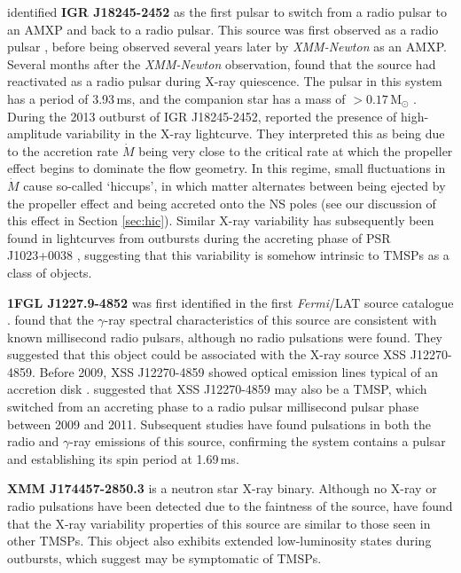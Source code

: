 \par \citealp{Papitto_Swings} identified \textbf{IGR J18245-2452} as the first pulsar to switch from a radio pulsar to an AMXP and back to a radio pulsar.  This source was first observed as a radio pulsar \citep{Manchester_PulsarCat}, before being observed several years later by \textit{XMM-Newton} \citep{Eckert_IGRJ18245} as an AMXP. Several months after the \textit{XMM-Newton} observation, \citealp{Papitto_Finding} found that the source had reactivated as a radio pulsar during X-ray quiescence. The pulsar in this system has a period of 3.93\,ms, and the companion star has a mass of $>0.17$\,M$_\odot$ \citep{Papitto_Swings}. During the 2013 outburst of IGR J18245-2452, \citealp{Ferrigno_TMSPVar} reported the presence of high-amplitude variability in the X-ray lightcurve. They interpreted this as being due to the accretion rate $\dot{M}$ being very close to the critical rate at which the propeller effect begins to dominate the flow geometry. In this regime, small fluctuations in $\dot{M}$ cause so-called `hiccups', in which matter alternates between being ejected by the propeller effect and being accreted onto the NS poles (see our discussion of this effect in Section \ref{sec:hic}). Similar X-ray variability has subsequently been found in lightcurves from outbursts during the accreting phase of PSR J1023+0038 \citep{Bogdanov_TMSPVar}, suggesting that this variability is somehow intrinsic to TMSPs as a class of objects.
\par \textbf{1FGL J1227.9-4852} was first identified in the first \textit{Fermi}/LAT source catalogue \citep{Abdo_Catalogue}. \citealp{Hill_XSS} found that the $\gamma$-ray spectral characteristics of this source are consistent with known millisecond radio pulsars, although no radio pulsations were found. They suggested that this object could be associated with the X-ray source XSS J12270-4859. Before 2009, XSS J12270-4859 showed optical emission lines typical of an accretion disk \citep{Pretorius_Optical}. \citealp{Hill_XSS} suggested that XSS J12270-4859 may also be a TMSP, which switched from an accreting phase to a radio pulsar millisecond pulsar phase between 2009 and 2011. Subsequent studies have found pulsations in both the radio \citep{Roy_12270Spin} and $\gamma$-ray \citep{Johnson_12270Spin} emissions of this source, confirming the system contains a pulsar and establishing its spin period at 1.69\,ms.
\par \textbf{XMM J174457-2850.3} is a neutron star X-ray binary. Although no X-ray or radio pulsations have been detected due to the faintness of the source, \citealp{Degenaar_174457} have found that the X-ray variability properties of this source are similar to those seen in other TMSPs. This object also exhibits extended low-luminosity states during outbursts, which \citealp{Degenaar_174457} suggest may be symptomatic of TMSPs.
